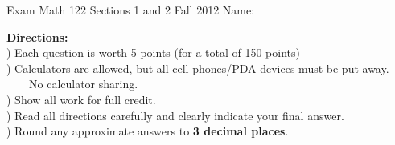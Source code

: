 \documentclass[12pt]{amsart}
\begin{document}
\thispagestyle{empty}
\centerline{\large Exam  \hfill Math 122 Sections 1 and 2 Fall 2012 \hfill Name: \underline{\phantom{Your name goes here, }}} 
 

 \indent \textbf{Directions:}\\
	\indent {}) Each question is worth 5 points (for a total of 150 points)\\
	\indent {}) Calculators are allowed, but all cell phones/PDA devices must be put away.\\ \indent \indent \ \ \ \ No calculator sharing.\\
	\indent {}) Show all work for full credit.\\
	\indent {}) Read all directions carefully and clearly indicate your final answer.\\
	\indent {}) Round any approximate answers to \textbf{3 decimal places}.\\
 
\end{document}
